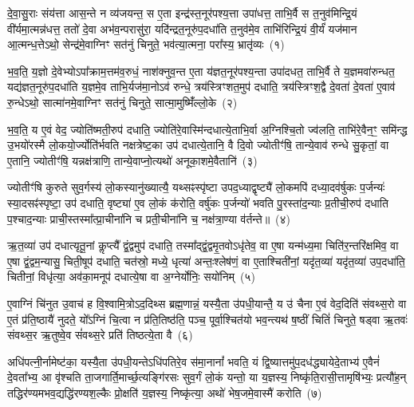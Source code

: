 \setcounter{anuvakam}{0}
दे॒वा॒सु॒राः संय॑त्ता आस॒न्ते न व्य॑जयन्त॒ स ए॒ता इन्द्र॑स्त॒नूर॑पश्य॒त्ता उपा॑धत्त॒ ताभि॒र्वै स त॒नुव॑मिन्द्रि॒यं वी॑र्यमा॒त्मन्न॑धत्त॒ ततो॑ दे॒वा अभ॑व॒न्परासु॑रा॒ यदि॑न्द्रत॒नूरु॑प॒दधा॑ति त॒नुव॑मे॒व ताभि॑रिन्द्रि॒यं वी॒र्यं॑ यज॑मान आ॒त्मन्ध॒त्ते\-ऽथो॒ सेन्द्र॑मे॒वाग्निꣳ सत॑नुं चिनुते॒ भव॑त्या॒त्मना॒ परा᳚स्य॒ भ्रातृ॑व्यः~(१)

भ॒व॒ति॒ य॒ज्ञो दे॒वेभ्यो\-ऽपा᳚क्राम॒त्तम॑व॒रुधं॒ नाश॑क्नुव॒न्त ए॒ता य॑ज्ञत॒नूर॑पश्य॒न्ता उपा॑दधत॒ ताभि॒र्वै ते य॒ज्ञमवा॑रुन्धत॒ यद्य॑ज्ञत॒नूरु॑प॒दधा॑ति य॒ज्ञमे॒व ताभि॒र्यज॑मा॒नो\-ऽव॑ रुन्धे॒ त्रय॑स्त्रिꣳशत॒मुप॑ दधाति॒ त्रय॑स्त्रिꣳश॒द्वै दे॒वता॑ दे॒वता॑ ए॒वाव॑ रु॒न्धे\-ऽथो॒ सात्मा॑नमे॒वाग्निꣳ सत॑नुं चिनुते॒ सात्मा॒मुष्मिँ॑ल्लो॒के~(२)

भ॒व॒ति॒ य ए॒वं वेद॒ ज्योति॑ष्मती॒रुप॑ दधाति॒ ज्योति॑रे॒वास्मि॑न्दधात्ये॒ताभि॒र्वा अ॒ग्निश्चि॒तो ज्व॑लति॒ ताभि॑रे॒वैन॒ꣳ॒ समि॑न्द्ध उ॒भयो॑रस्मै लो॒कयो॒र्ज्योति॑र्भवति नक्षत्रेष्ट॒का उप॑ दधात्ये॒तानि॒ वै दि॒वो ज्योतीꣳ॑षि॒ तान्ये॒वाव॑ रुन्धे सु॒कृतां॒ वा ए॒तानि॒ ज्योतीꣳ॑षि॒ यन्नक्ष॑त्राणि॒ तान्ये॒वाप्नो॒त्यथो॑ अनूका॒शमे॒वैतानि॑~(३)

ज्योतीꣳ॑षि कुरुते सुव॒र्गस्य॑ लो॒कस्यानु॑ख्यात्यै॒ यथ्सꣴस्पृ॑ष्टा उपद॒ध्याद्वृष्ट्यै॑ लो॒कमपि॑ दध्या॒दव॑र्\mbox{}षुकः प॒र्जन्यः॑ स्या॒दसꣴ॑स्पृष्टा॒ उप॑ दधाति॒ वृष्ट्या॑ ए॒व लो॒कं क॑रोति॒ वर्\mbox{}षु॑कः प॒र्जन्यो॑ भवति पु॒रस्ता॑द॒न्याः प्र॒तीची॒रुप॑ दधाति प॒श्चाद॒न्याः प्राची॒स्तस्मा᳚त्प्रा॒चीना॑नि च प्रती॒चीना॑नि च॒ नक्ष॑त्रा॒ण्या व॑र्तन्ते॥~(४)

{\anuvakamend[{भ्रातृ॑व्यो लो॒क ए॒वैतान्येक॑चत्वारिꣳशच्च}]}%

ऋ॒त॒व्या॑ उप॑ दधात्यृतू॒नां कॢप्त्यै᳚ द्वं॒द्वमुप॑ दधाति॒ तस्मा᳚द्द्वं॒द्वमृ॒तवो\-ऽधृ॑तेव॒ वा ए॒षा यन्म॑ध्य॒मा चिति॑र॒न्तरि॑क्षमिव॒ वा ए॒षा द्वं॒द्वम॒न्यासु॒ चिती॒षूप॑ दधाति॒ चत॑स्रो॒ मध्ये॒ धृत्या॑ अन्तः॒श्लेष॑णं॒ वा ए॒ताश्चिती॑नां॒ यदृ॑त॒व्या॑ यदृ॑त॒व्या॑ उप॒दधा॑ति॒ चितीनां॒ विधृ॑त्या॒ अव॑का॒मनूप॑ दधात्ये॒षा वा अ॒ग्नेर्योनिः॒ सयो॑निम्~(५)

ए॒वाग्निं चि॑नुत उ॒वाच॑ ह वि॒श्वामि॒त्रो\-ऽद॒दिथ्स ब्रह्म॒णान्नं॒ यस्यै॒ता उ॑पधी॒यान्तै॒ य उ॑ चैना ए॒वं वेद॒दिति॑ संवथ्स॒रो वा ए॒तं प्र॑ति॒ष्ठायै॑ नुदते॒ यो᳚\-ऽग्निं चि॒त्वा न प्र॑ति॒तिष्ठ॑ति॒ पञ्च॒ पूर्वा॒श्चित॑यो भव॒न्त्यथ॑ ष॒ष्ठीं चितिं॑ चिनुते॒ षड्वा ऋ॒तवः॑ संवथ्स॒र ऋ॒तुष्वे॒व सं॑वथ्स॒रे प्रति॑ तिष्ठत्ये॒ता वै~(६)

अधि॑पत्नी॒र्नामेष्ट॑का॒ यस्यै॒ता उ॑पधी॒यन्ते\-ऽधि॑पतिरे॒व स॑मा॒नानां᳚ भवति॒ यं द्वि॒ष्यात्तमु॑प॒दध॑द्ध्यायेदे॒ताभ्य॑ ए॒वैनं॑ दे॒वता᳚भ्य॒ आ वृ॑श्चति ता॒जगार्ति॒मार्च्छ॒त्यङ्गि॑रसः सुव॒र्गं लो॒कं यन्तो॒ या य॒ज्ञस्य॒ निष्कृ॑ति॒रासी॒त्तामृषि॑भ्यः॒ प्रत्यौ॑ह॒न् तद्धिर॑ण्यमभव॒द्यद्धि॑रण्यश॒ल्कैः प्रो॒क्षति॑ य॒ज्ञस्य॒ निष्कृ॑त्या॒ अथो॑ भेष॒जमे॒वास्मै॑ करोति~(७)


